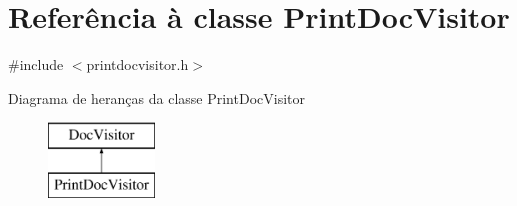\hypertarget{class_print_doc_visitor}{\section{Referência à classe Print\-Doc\-Visitor}
\label{class_print_doc_visitor}
}


{\ttfamily \#include $<$printdocvisitor.\-h$>$}

Diagrama de heranças da classe Print\-Doc\-Visitor\begin{figure}[H]
\begin{center}
\leavevmode
\includegraphics[height=2.000000cm]{class_print_doc_visitor}
\end{center}
\end{figure}
